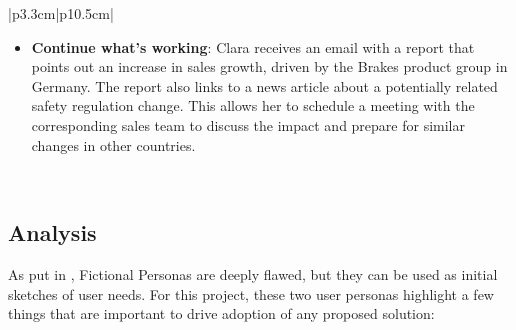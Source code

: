 \documentclass[a4paper]{report}
\begin{document}
\begin{tabular}{|p{3.3cm}|p{10.5cm}|}
\begin{minipage}[t]{\linewidth}
\begin{itemize}
        \item \textbf{Continue what's working}: Clara receives an email with a report that points out an increase in sales growth, driven by the Brakes product group in Germany. The report also links to a news article about a potentially related safety regulation change. This allows her to schedule a meeting with the corresponding sales team to discuss the impact and prepare for similar changes in other countries.
    \end{itemize}
    \vspace{0.05em}
\end{minipage} \\
\hline
\end{tabular}

\subsection{Analysis}

As put in \cite{ixdf_personas_2025}, Fictional Personas are deeply flawed, but they can be used as initial sketches of user needs. For this project, these two user personas highlight a few things that are important to drive adoption of any proposed solution:
\end{document}
